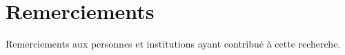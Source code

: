 \section*{Remerciements}
Remerciements aux personnes et institutions ayant contribué à cette recherche.
